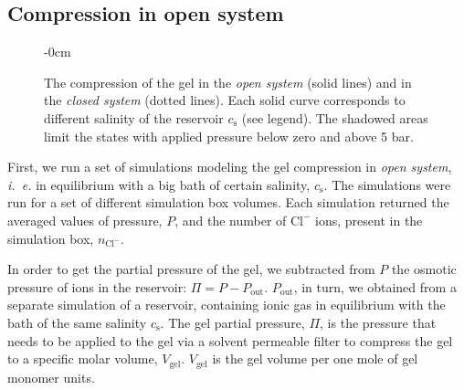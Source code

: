 \documentclass[journal,article,submit,pdftex,moreauthors]{Definitions/mdpi}
\newcommand{\ie}{\textit{i.~e.} }
\newcommand{\ncl}{n_\mathrm{Cl^-}}
\newcommand{\cl}{\mathrm{Cl^-}}
\newcommand{\cs}{c_{\mathrm{s}}}
\newcommand{\Vgel}{V_\mathrm{gel}}
\newcommand{\Pgel}{\Pi}
\newcommand{\Pout}{P_\mathrm{out}}
\begin{document}
\subsection{Compression in open system}
\begin{figure}[h]
	\begin{adjustwidth}{-\extralength}{0cm}
	\hspace{0.02\textwidth}
	\caption{
	The compression of the gel in the \emph{open system} (solid lines) and in the \emph{closed system} (dotted lines). 
	Each solid curve corresponds to different salinity of the reservoir $\cs$ (see legend).
	The shadowed areas limit the states with applied pressure below zero and above 5 bar.\label{fig: PV and CV}}
	\end{adjustwidth}
\end{figure}
First, we run a set of simulations modeling the gel compression in \emph{open system}, \ie in equilibrium with a big bath of certain salinity, $\cs$. 
The simulations were run for a set of different simulation box volumes. 
Each simulation returned the averaged values of pressure, $P$, and the number of $\cl$ ions, present in the simulation box, $\ncl$. 

In order to get the partial pressure of the gel, we subtracted from $P$ the osmotic pressure of ions in the reservoir: $\Pgel=P - \Pout$.
$\Pout$, in turn, we obtained from a separate simulation of a reservoir, containing ionic gas in equilibrium with the bath of the same salinity $\cs$. 
The gel partial pressure, $\Pgel$, is the pressure that needs to be applied to the gel via a solvent permeable filter to compress the gel to a specific molar volume, $\Vgel$. $\Vgel$ is the gel volume per one mole of gel monomer units.
\end{document}
